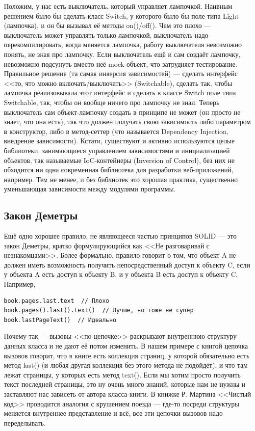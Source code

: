 \documentclass[a5paper]{article}
\begin{document}
\begin{itemize}
        Положим, у нас есть выключатель, который управляет лампочкой. Наивным решением было бы сделать класс Switch, у которого было бы поле типа Light (лампочка), и он бы вызывал её методы on()/off(). Чем это плохо --- выключатель может управлять только лампочкой, выключатель надо перекомпилировать, когда меняется лампочка, работу выключателя невозможно понять, не зная про лампочку. Если выключатель ещё и сам создаёт лампочку, невозможно подсунуть вместо неё mock-объект, что затрудняет тестирование. Правильное решение (та самая инверсия зависимостей) --- сделать интерфейс <<то, что можно включать/выключать>> (Switchable), сделать так, чтобы лампочка реализовывала этот интерфейс и сделать в классе Switch поле типа Switchable, так, чтобы он вообще ничего про лампочку не знал. Теперь выключатель сам объект-лампочку создать в принципе не может (он просто не знает, что она есть), так что должен получать свою зависимость либо параметром в конструктор, либо в метод-сеттер (что называется Dependency Injection, внедрение зависимости). Кстати, существуют и активно используются целые библиотеки, занимающиеся управлением зависимостями и инициализацией объектов, так называемые IoC-контейнеры (Inversion of Control), без них не обходится ни одна современная библиотека для разработки веб-приложений, например. Тем не менее, и без библиотек это хорошая практика, существенно уменьшающая зависимости между модулями программы.
\end{itemize}

\subsection{Закон Деметры}

Ещё одно хорошее правило, не являющееся частью принципов SOLID --- это закон Деметры, кратко формулирующийся как <<Не разговаривай с незнакомцами>>. Более формально, правило говорит о том, что объект A не должен иметь возможность получить непосредственный доступ к объекту C, если у объекта A есть доступ к объекту B, и у объекта B есть доступ к объекту C. Например,

\begin{verbatim}
book.pages.last.text  // Плохо
book.pages().last().text()  // Лучше, но тоже не супер
book.lastPageText()  // Идеально
\end{verbatim}

Почему так --- вызовы <<по цепочке>> раскрывают внутреннюю структуру данных класса и не дают её потом изменить. В нашем примере с книгой цепочка вызовов говорит, что в книге есть коллекция страниц, у которой обязательно есть метод last() (и любая другая коллекция без этого метода не подойдёт), и что там лежат страницы, у которых есть метод text(). Если мы хотим просто получить текст последней страницы, это ну очень много знаний, которые нам не нужны и заставляют нас зависеть от автора класса-книги. В книжке Р. Мартина <<Чистый код>> проводится аналогия с крушением поезда --- где-то посреди структуры меняется внутреннее представление и всё, все эти цепочки вызовов надо переделывать.
\end{document}
